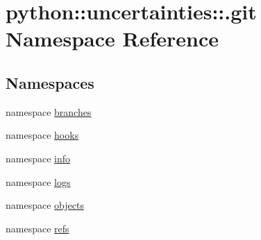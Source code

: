 \hypertarget{namespacepython_1_1uncertainties_1_1_8git}{
\section{python::uncertainties::.git Namespace Reference}
\label{namespacepython_1_1uncertainties_1_1_8git}
}
\subsection*{Namespaces}
\begin{DoxyCompactItemize}
\item 
namespace \hyperlink{namespacepython_1_1uncertainties_1_1_8git_1_1branches}{branches}
\item 
namespace \hyperlink{namespacepython_1_1uncertainties_1_1_8git_1_1hooks}{hooks}
\item 
namespace \hyperlink{namespacepython_1_1uncertainties_1_1_8git_1_1info}{info}
\item 
namespace \hyperlink{namespacepython_1_1uncertainties_1_1_8git_1_1logs}{logs}
\item 
namespace \hyperlink{namespacepython_1_1uncertainties_1_1_8git_1_1objects}{objects}
\item 
namespace \hyperlink{namespacepython_1_1uncertainties_1_1_8git_1_1refs}{refs}
\end{DoxyCompactItemize}
